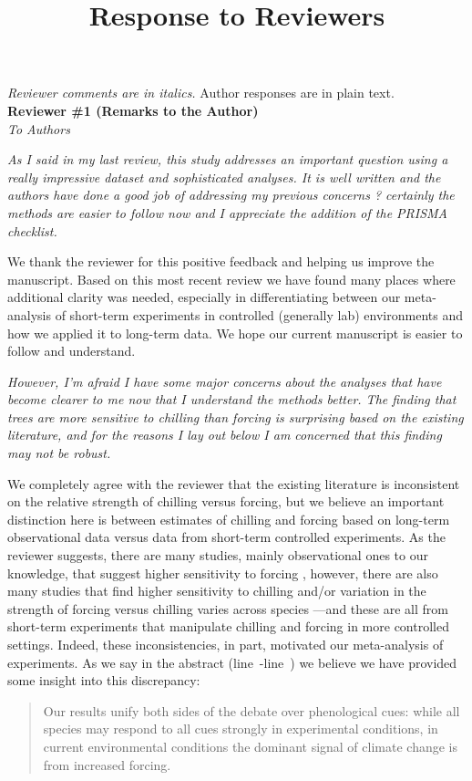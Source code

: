 \documentclass{article}
\newcommand{\lr}[1]{line~\lineref{#1}}
\begin{document}


\setlength\parindent{0pt}


\title{Response to Reviewers}
\emph{Reviewer comments are in italics.} Author responses are in plain text.\\

{\bf Reviewer \#1 (Remarks to the Author)}\\

\emph{To Authors}

\emph{As I said in my last review, this study addresses an important question using a really impressive
dataset and sophisticated analyses. It is well written and the authors have done a good job of
addressing my previous concerns ? certainly the methods are easier to follow now and I appreciate
the addition of the PRISMA checklist.}

We thank the reviewer for this positive feedback and helping us improve the manuscript. Based on this most recent review we have found many places where additional clarity was needed, especially in differentiating between our meta-analysis of short-term experiments in controlled (generally lab) environments and how we applied it to long-term data. We hope our current manuscript is easier to follow and understand.

\emph{However, I'm afraid I have some major concerns about the analyses that have become clearer to me
now that I understand the methods better. The finding that trees are more sensitive to chilling than
forcing is surprising based on the existing literature, and for the reasons I lay out below I am
concerned that this finding may not be robust.}

We completely agree with the reviewer that the existing literature is inconsistent on the relative strength of chilling versus forcing, but we believe an important distinction here is between estimates of chilling and forcing based on long-term observational data versus data from short-term controlled experiments. As the reviewer suggests, there are many studies, mainly observational ones to our knowledge, that suggest higher sensitivity to forcing \citep[e.g., ][]{fu2012,Rutishauser:2008},  however, there are also many studies that find higher sensitivity to chilling \citep[e.g., ][]{zohner2016, Laube:2014a,Heide:2005aa} and/or variation in the strength of forcing versus chilling varies across species \citep[e.g.,][]{harrington2015,Basler:2014aa,Caffarra:2011a,Caffarra:2011b,koerner2010a}---and these are all from short-term experiments that manipulate chilling and forcing in more controlled settings. Indeed, these inconsistencies, in part, motivated our meta-analysis of experiments. As we say in the abstract (\lr{unifydebatestart}-\lr{unifydebateend}) we believe we have provided some insight into this discrepancy:
\begin{quote}
Our results unify both sides of the debate over phenological cues: while all species may respond to all cues strongly in experimental conditions, in current environmental conditions the dominant signal of climate change is from increased forcing. 
\end{quote}
\end{document}
